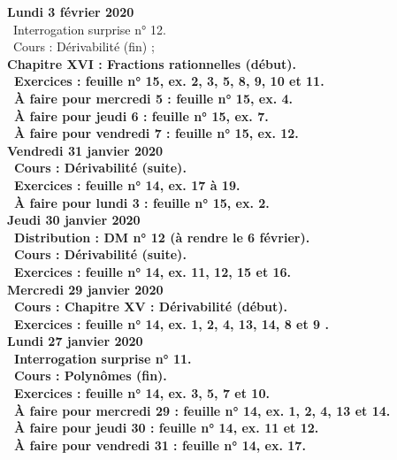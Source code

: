 \documentclass[12pt,a4paper]{article}
\begin{document}
\noindent\textbf{\bf Lundi 3 février 2020} \\
\bu\ Interrogation surprise n° 12.\\
\bu\ Cours :  Dérivabilité (fin) ;\\
\bf Chapitre XVI \rm : Fractions rationnelles (début).\\
\bu\ Exercices : feuille n° 15, ex. 2, 3, 5, 8, 9, 10 et 11.\\
\bu\ À faire pour mercredi 5 : feuille n° 15, ex. 4.\\
\bu\ À faire pour jeudi 6 : feuille n° 15, ex. 7.\\
\bu\ À faire pour vendredi 7 : feuille n° 15, ex. 12.\vspace{.4cm}\\
 
\noindent\textbf{Vendredi 31 janvier 2020}\\
\bu\ Cours : Dérivabilité (suite).\\
\bu\ Exercices : feuille n° 14, ex. 17 à 19.\\
\bu\ À faire pour lundi 3 : feuille n° 15, ex. 2.\vspace{.4cm}\\
 
\noindent\textbf{Jeudi 30 janvier 2020}\\
\bu\ Distribution : DM n° 12 (à rendre le 6 février).\\
\bu\ Cours : Dérivabilité (suite).\\
\bu\ Exercices : feuille n° 14, ex. 11, 12, 15 et 16.\vspace{.4cm}\\
  
\noindent\textbf{Mercredi 29 janvier 2020} \\
\bu\ Cours : \bf Chapitre XV \rm : Dérivabilité (début).\\
\bu\ Exercices : feuille n° 14, ex. 1, 2, 4, 13, 14, 8 et 9 .\vspace{.4cm}\\
  
\noindent\textbf{Lundi 27 janvier 2020} \\
\bu\ Interrogation surprise n° 11.\\
\bu\ Cours : Polynômes (fin).\\
\bu\ Exercices : feuille n° 14, ex. 3, 5, 7 et 10.\\
\bu\ À faire pour mercredi 29 : feuille n° 14, ex. 1, 2, 4, 13 et 14.\\
\bu\ À faire pour jeudi 30 : feuille n° 14, ex. 11 et 12.\\
\bu\ À faire pour vendredi 31 : feuille n° 14, ex. 17.\vspace{.4cm}\\
\end{document}
